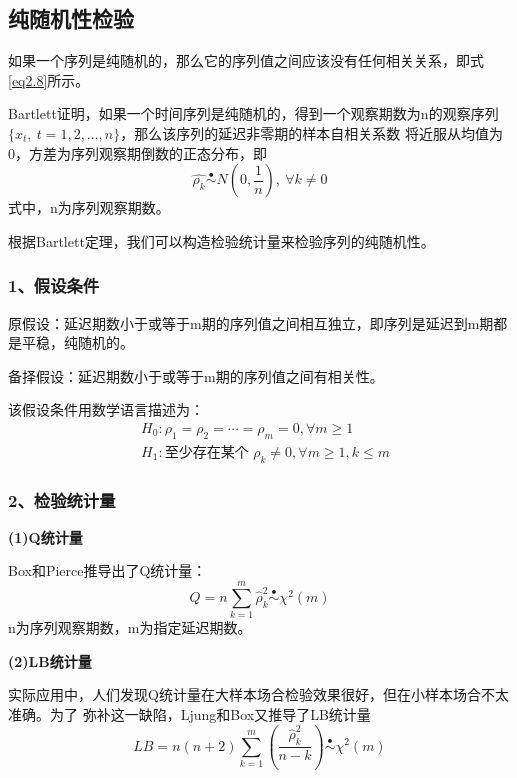 \documentclass[12pt, a4paper, oneside]{ctexbook}
\begin{document}
\subsection{纯随机性检验}\label{subse2.3.3}
如果一个序列是纯随机的，那么它的序列值之间应该没有任何相关关系，即式\ref{eq2.8}所示。

Bartlett证明，如果一个时间序列是纯随机的，得到一个观察期数为n的观察序列$\{x_t,~t = 1,2,...,n\}$，那么该序列的延迟非零期的样本自相关系数
将近服从均值为0，方差为序列观察期倒数的正态分布，即
\begin{equation}
    \hat{\rho_k} \overset{\bullet}{\operatorname*{\sim}} N(0,\frac{1}{n}),~\forall k \neq 0
\end{equation}
式中，n为序列观察期数。

根据Bartlett定理，我们可以构造检验统计量来检验序列的纯随机性。

\subsubsection{1、假设条件}
原假设：延迟期数小于或等于m期的序列值之间相互独立，即序列是延迟到m期都是平稳，纯随机的。

备择假设：延迟期数小于或等于m期的序列值之间有相关性。

该假设条件用数学语言描述为：
\begin{equation}
    \begin{aligned}
         & H_0:\rho_1=\rho_2=\cdots=\rho_m=0,\forall m\geqslant1                \\
         & H_1:\text{至少存在某个 }\rho_k\neq0,\forall m\geqslant1,k\leqslant m
    \end{aligned}
\end{equation}

\subsubsection{2、检验统计量}

\textbf{(1)Q统计量}

Box和Pierce推导出了Q统计量：
\begin{equation}
    Q=n\sum_{k\operatorname{=}1}^m\hat{\rho}_k^2\overset{\bullet}{\operatorname*{\sim}}\chi^2(m)
\end{equation}
n为序列观察期数，m为指定延迟期数。

\textbf{(2)LB统计量}

实际应用中，人们发现Q统计量在大样本场合检验效果很好，但在小样本场合不太准确。为了
弥补这一缺陷，Ljung和Box又推导了LB统计量
\begin{equation}
    LB=n(n+2)\sum_{k=1}^m\left(\frac{\hat{\rho}_k^2}{n-k}\right)
    \overset{\bullet}{\operatorname*{\sim}} \chi^2(m)
\end{equation}
\end{document}

